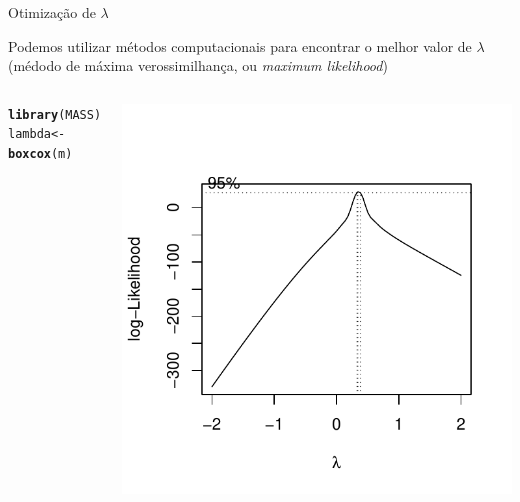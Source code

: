 \documentclass{beamer}\usepackage[]{graphicx}\usepackage[]{color}
\makeatletter
\newcommand{\hlstd}[1]{\textcolor[rgb]{0.345,0.345,0.345}{#1}}%
\newcommand{\hlkwb}[1]{\textcolor[rgb]{0.69,0.353,0.396}{#1}}%
\newcommand{\hlkwd}[1]{\textcolor[rgb]{0.737,0.353,0.396}{\textbf{#1}}}%
\newenvironment{kframe}{%
 \def\at@end@of@kframe{}%
 \ifinner\ifhmode%
  \def\at@end@of@kframe{\end{minipage}}%
  \begin{minipage}{\columnwidth}%
 \fi\fi%
 \def\FrameCommand##1{\hskip\@totalleftmargin \hskip-\fboxsep
 \colorbox{shadecolor}{##1}\hskip-\fboxsep
     \hskip-\linewidth \hskip-\@totalleftmargin \hskip\columnwidth}%
 \MakeFramed {\advance\hsize-\width
   \@totalleftmargin\z@ \linewidth\hsize
   \@setminipage}}%
 {\par\unskip\endMakeFramed%
 \at@end@of@kframe}
\newenvironment{knitrout}{}{} %
\renewenvironment{knitrout}{\setlength{\topsep}{0mm}}{}
\makeatother
\begin{document}
\begin{frame}[fragile]{Otimização de $\lambda$}

 Podemos utilizar métodos computacionais para encontrar o melhor valor de $\lambda$ (médodo de máxima verossimilhança, ou \emph{maximum likelihood})

\begin{columns}[c]


\begin{knitrout}\tiny
{}\color{fgcolor}\begin{kframe}
\begin{alltt}
\hlkwd{library}\hlstd{(MASS)}
\hlstd{lambda} \hlkwb{<-} \hlkwd{boxcox}\hlstd{(m)}
\end{alltt}
\end{kframe}
\end{knitrout}


\centering
\begin{knitrout}\scriptsize
{}\color{fgcolor}
\includegraphics[width=0.9\linewidth]{figure/oti4-1} 

\end{knitrout}

\end{columns}

\end{frame}
\end{document}
